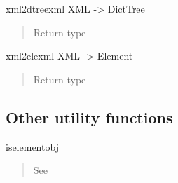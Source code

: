 \documentclass[a4paper,10pt,english]{manual}
\begin{document}
\hypertarget{ncclient.content.xml2dtree}{}\begin{funcdesc}{xml2dtree}{xml}
XML -\textgreater{} DictTree
\begin{quote}\begin{description}
\item[Return type]
\href{http://docs.python.org/library/stdtypes.html\#dict}{}

\end{description}\end{quote}
\end{funcdesc}

\hypertarget{ncclient.content.xml2ele}{}\begin{funcdesc}{xml2ele}{xml}
XML -\textgreater{} Element
\begin{quote}\begin{description}
\item[Return type]
\href{http://docs.python.org/library/xml.etree.elementtree.html\#xml.etree.ElementTree.Element}{}

\end{description}\end{quote}
\end{funcdesc}


\subsection{Other utility functions}

\hypertarget{ncclient.content.iselement}{}\begin{funcdesc}{iselement}{obj}~\begin{quote}\begin{description}
\item[See]
\href{http://docs.python.org/library/xml.etree.elementtree.html\#xml.etree.ElementTree.iselement}{}

\end{description}\end{quote}
\end{funcdesc}
\end{document}
